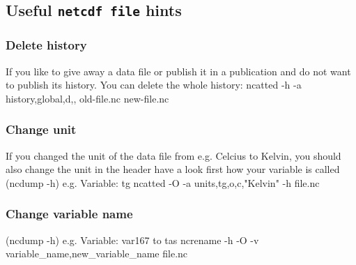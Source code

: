 \subsection{Useful \texttt{netcdf file} hints}

\subsubsection{Delete history}
If you like to give away a data file or publish it in a publication and do not want to publish its history. 
You can delete the whole history:
ncatted -h -a history,global,d,, old-file.nc new-file.nc

\subsubsection{Change unit}
If you changed the unit of the data file from e.g. Celcius to Kelvin, you should also change the unit in the header
have a look first how your variable is called  (ncdump -h) 
e.g. Variable: tg
ncatted -O -a units,tg,o,c,"Kelvin" -h file.nc

\subsubsection{Change variable name} 
(ncdump -h) e.g. Variable: var167 to tas 
 ncrename -h -O -v variable_name,new_variable_name file.nc